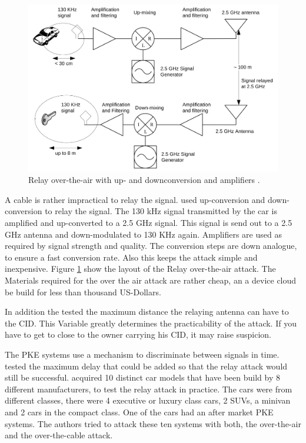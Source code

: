 	\begin{figure}[t]
		\begin{center}
			\includegraphics[width=\textwidth]{pictures/franc_relay_over_the_air.png}
		\end{center}
		\caption{Relay over-the-air with up- and downconversion and amplifiers \citep[p. 6]{relayAttacksFranc}.}
		\label{fig:relayOTA}
	\end{figure}

	A cable is rather impractical to relay the signal.
	\citeauthor{relayAttacksFranc} used up-conversion and down-conversion to relay the signal.
	The 130 kHz signal transmitted by the car is amplified and up-converted to a 2.5 GHz signal.
	This signal is send out to a 2.5 GHz antenna and down-modulated to 130 KHz again.
	Amplifiers are used as required by signal strength and quality.
	The conversion steps are down analogue,
	to ensure a fast conversion rate.
	Also this keeps the attack simple and inexpensive.
	Figure \ref{fig:relayOTA} show the layout of the Relay over-the-air attack.
	The Materials required for the over the air attack are rather cheap,
	an a device cloud be build for less than thousand US-Dollars.  %

	In addition the \citeauthor{relayAttacksFranc} tested the maximum distance
	the relaying antenna can have to the CID.
	This Variable greatly determines the practicability of the attack.
	If you have to get to close to the owner carrying his CID,
	it may raise suspicion.

	The PKE systems use a mechanism to discriminate between signals in time.
	\citeauthor{relayAttacksFranc} tested the maximum delay that could be added
	so that the relay attack would still be successful.
	\citeauthor{relayAttacksFranc} acquired 10 distinct car models that have been build by 8 different manufacturers,
	to test the relay attack in practice.
	The cars were from different classes,
	there were 4 executive or luxury class cars, 2 SUVs, a minivan and 2 cars in the compact class.
	One of the cars had an after market PKE systems.
	The authors tried to attack these ten systems with both,
	the over-the-air and the over-the-cable attack.

